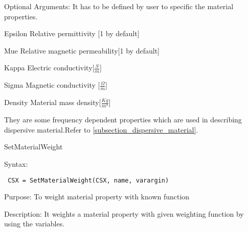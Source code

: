  \begin{FontDescr}{Optional Arguments:}
  It has to be defined by user to specific the material properties. 
   \begin{FontPara}{Epsilon} Relative permittivity [1 by default]\end{FontPara}

  \begin{FontPara}{Mue} Relative magnetic permeability[1 by default]\end{FontPara}

  \begin{FontPara}{Kappa} Electric conductivity[$\frac{S}{m}$]\end{FontPara}

   \begin{FontPara}{Sigma} Magnetic conductivity [$\frac{\Omega}{m}$]\end{FontPara}

  \begin{FontPara}{Density} Material mass density[$\frac{Kg}{m^{3}}$] \end{FontPara}

   They are some frequency dependent properties which are used in describing dispersive material.Refer to \ref{subsection_dispersive_material}. 
  
 \end{FontDescr}


\begin{FontNameFunct}{SetMaterialWeight}
\end{FontNameFunct}

\begin{FontDescr}{Syntax:}
  \begin{lstlisting}
 CSX = SetMaterialWeight(CSX, name, varargin)
  \end{lstlisting}
\end{FontDescr}  

\begin{FontDescr}{Purpose:}
To weight material property with known function
\end{FontDescr}

\begin{FontDescr}{Description:}
It weights a material property with given weighting function by using the variables.
\end{FontDescr}

